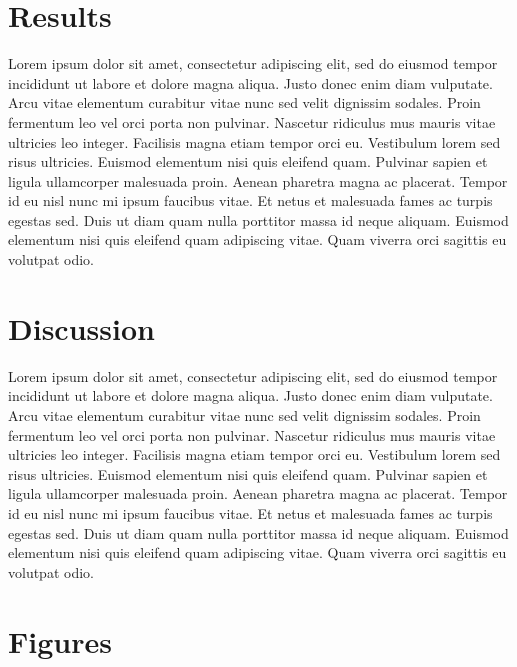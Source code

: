 \documentclass[letterpaper]{article}
\begin{document}
\section{Results}

Lorem ipsum dolor sit amet, consectetur adipiscing elit, sed do eiusmod tempor incididunt ut labore et dolore magna aliqua. Justo donec enim diam vulputate. Arcu vitae elementum curabitur vitae nunc sed velit dignissim sodales. Proin fermentum leo vel orci porta non pulvinar. Nascetur ridiculus mus mauris vitae ultricies leo integer. Facilisis magna etiam tempor orci eu. Vestibulum lorem sed risus ultricies. Euismod elementum nisi quis eleifend quam. Pulvinar sapien et ligula ullamcorper malesuada proin. Aenean pharetra magna ac placerat. Tempor id eu nisl nunc mi ipsum faucibus vitae. Et netus et malesuada fames ac turpis egestas sed. Duis ut diam quam nulla porttitor massa id neque aliquam. Euismod elementum nisi quis eleifend quam adipiscing vitae. Quam viverra orci sagittis eu volutpat odio.


\section{Discussion}

Lorem ipsum dolor sit amet, consectetur adipiscing elit, sed do eiusmod tempor incididunt ut labore et dolore magna aliqua. Justo donec enim diam vulputate. Arcu vitae elementum curabitur vitae nunc sed velit dignissim sodales. Proin fermentum leo vel orci porta non pulvinar. Nascetur ridiculus mus mauris vitae ultricies leo integer. Facilisis magna etiam tempor orci eu. Vestibulum lorem sed risus ultricies. Euismod elementum nisi quis eleifend quam. Pulvinar sapien et ligula ullamcorper malesuada proin. Aenean pharetra magna ac placerat. Tempor id eu nisl nunc mi ipsum faucibus vitae. Et netus et malesuada fames ac turpis egestas sed. Duis ut diam quam nulla porttitor massa id neque aliquam. Euismod elementum nisi quis eleifend quam adipiscing vitae. Quam viverra orci sagittis eu volutpat odio.


\section{Figures}






\end{document}
